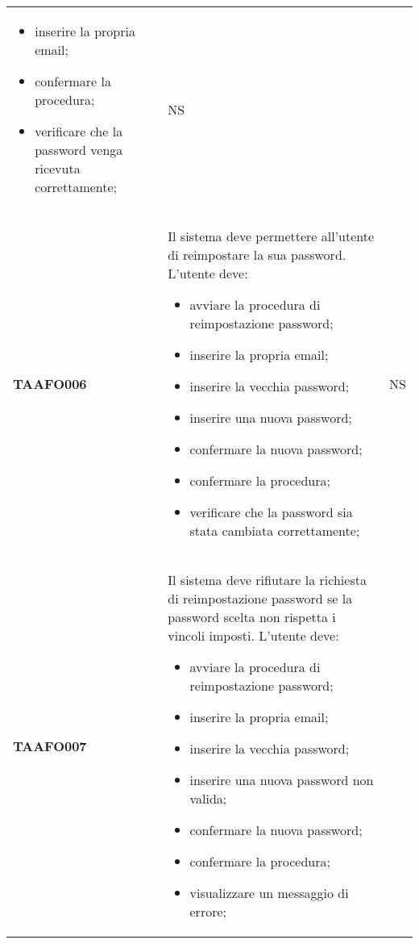 \documentclass[../piano-di-qualifica.tex]{subfiles}
\begin{document}
\begin{longtable}[H]{>{\centering\bfseries}m{3cm} >{}m{11cm} >{\centering\arraybackslash}m{2cm}}
\begin{itemize}
    \item inserire la propria email;
    \item confermare la procedura;
    \item verificare che la password venga ricevuta correttamente;
  \end{itemize}
                                  & NS                                                                                                                                                                                                                                   \\
  TAAFO006                        & Il sistema deve permettere all’utente di reimpostare la sua password. \newline
  L’utente deve:
  \begin{itemize}
    \item avviare la procedura di reimpostazione password;
    \item inserire la propria email;
    \item inserire la vecchia password;
    \item inserire una nuova password;
    \item confermare la nuova password;
    \item confermare la procedura;
    \item verificare che la password sia stata cambiata correttamente;
  \end{itemize}
                                  & NS                                                                                                                                                                                                                                   \\
  TAAFO007                        & Il sistema deve rifiutare la richiesta di reimpostazione password se la password scelta non rispetta i vincoli imposti. \newline
  L’utente deve:
  \begin{itemize}
    \item avviare la procedura di reimpostazione password;
    \item inserire la propria email;
    \item inserire la vecchia password;
    \item inserire una nuova password non valida;
    \item confermare la nuova password;
    \item confermare la procedura;
    \item visualizzare un messaggio di errore;

\end{itemize}
\end{longtable}
\end{document}
